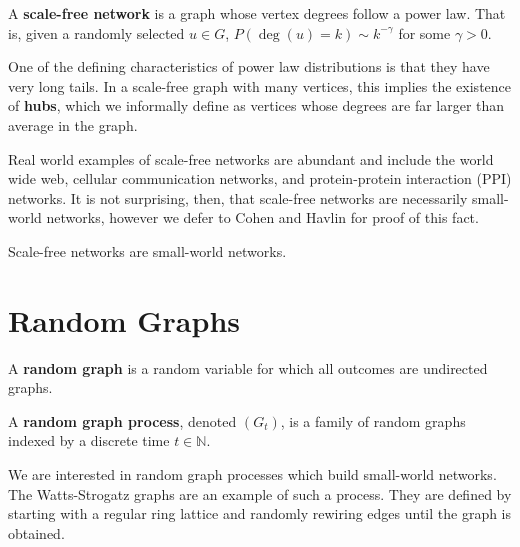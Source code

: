 
\begin{definition}
  A \textbf{scale-free network} is a graph whose vertex degrees follow a power
  law. That is, given a randomly selected $u \in G$,
  $P(\deg(u) = k) \sim k^{-\gamma}$ for some $\gamma > 0$.
\end{definition}

One of the defining characteristics of power law distributions is that they have
very long tails. In a scale-free graph with many vertices, this implies the
existence of \textbf{hubs}, which we informally define as vertices whose degrees
are far larger than average in the graph.

Real world examples of scale-free networks are abundant and include the world
wide web, cellular communication networks, and protein-protein interaction (PPI)
networks. It is not surprising, then, that scale-free networks are necessarily
small-world networks, however we defer to Cohen and Havlin for proof of this
fact.

\begin{theorem}
  Scale-free networks are small-world networks.
\end{theorem}



\section{Random Graphs}
\label{sec:random_graphs}


\begin{definition}
  A \textbf{random graph} is a random variable for which all outcomes are
  undirected graphs.

  A \textbf{random graph process}, denoted $(G_t)$, is a family of random graphs
  indexed by a discrete time $t \in \mathbb{N}$.
\end{definition}

We are interested in random graph processes which build small-world networks.
The Watts-Strogatz graphs are an example of such a process. They are defined by
starting with a regular ring lattice and randomly rewiring edges until the graph
is obtained.

